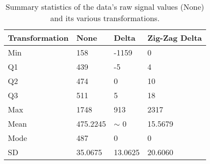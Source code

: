 \begin{table}
    \caption{\label{tab:trans} Summary statistics of the data's raw signal values (None) and its various transformations.}
    \begin{tabular}{|l|l|l|l|}
        \hline
Transformation & None & Delta & Zig-Zag Delta\\
        \hline
Min & 158& -1159& 0\\
	    Q1 & 439& -5& 4\\

Q2 & 474& 0& 10\\
	    Q3 & 511& 5& 18\\
Max & 1748& 913& 2317\\
\hline
Mean & 475.2245& $\sim$ 0& 15.5679\\
	    Mode & 487& 0& 0\\
SD & 35.0675& 13.0625& 20.6060\\
	\hline
    \end{tabular}
\end{table}
